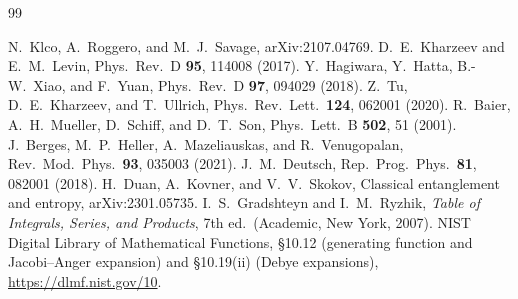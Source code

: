 \documentclass[aps,preprint,12pt,superscriptaddress,nofootinbib]{revtex4-2}
\begin{document}
\begin{thebibliography}{99}

 N.~Klco, A.~Roggero, and M.~J.~Savage, arXiv:2107.04769.
 D.~E.~Kharzeev and E.~M.~Levin, Phys.\ Rev.\ D \textbf{95},
114008 (2017).
 Y.~Hagiwara, Y.~Hatta, B.-W.~Xiao, and F.~Yuan, Phys.\ Rev.\ D
\textbf{97}, 094029 (2018).
 Z.~Tu, D.~E.~Kharzeev, and T.~Ullrich, Phys.\ Rev.\ Lett.\
\textbf{124}, 062001 (2020).
 R.~Baier, A.~H.~Mueller, D.~Schiff, and D.~T.~Son, Phys.\ Lett.\ B
\textbf{502}, 51 (2001).
 J.~Berges, M.~P.~Heller, A.~Mazeliauskas, and R.~Venugopalan,
Rev.\ Mod.\ Phys.\ \textbf{93}, 035003 (2021).
 J.~M.~Deutsch, Rep.\ Prog.\ Phys.\ \textbf{81}, 082001 (2018).
\bibitem{DKS} H.~Duan, A.~Kovner, and V.~V.~Skokov, Classical entanglement and
entropy, arXiv:2301.05735.
 I.~S.~Gradshteyn and I.~M.~Ryzhik, \emph{Table of Integrals, Series, and
Products}, 7th ed.\ (Academic, New York, 2007).
 NIST Digital Library of Mathematical Functions, \S10.12 (generating
function and Jacobi--Anger expansion) and \S10.19(ii) (Debye expansions),
\url{https://dlmf.nist.gov/10}.

\end{thebibliography}
\end{document}
